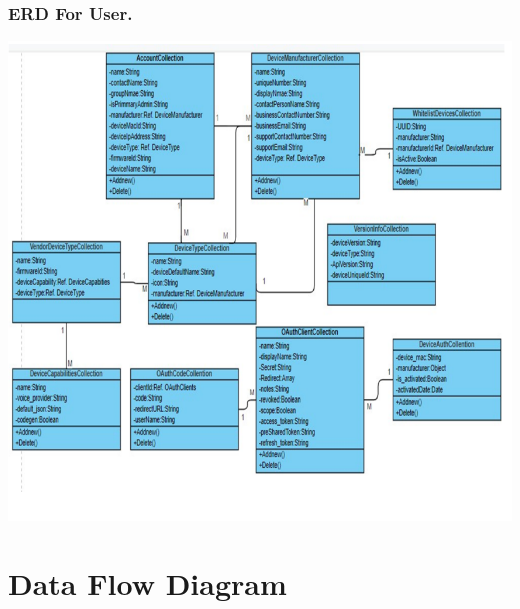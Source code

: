 \subsubsection{ERD For User.}
\includegraphics[scale=0.7]{Diag/ERDuser.png}
\label{abc}




%

\section{Data Flow Diagram}

